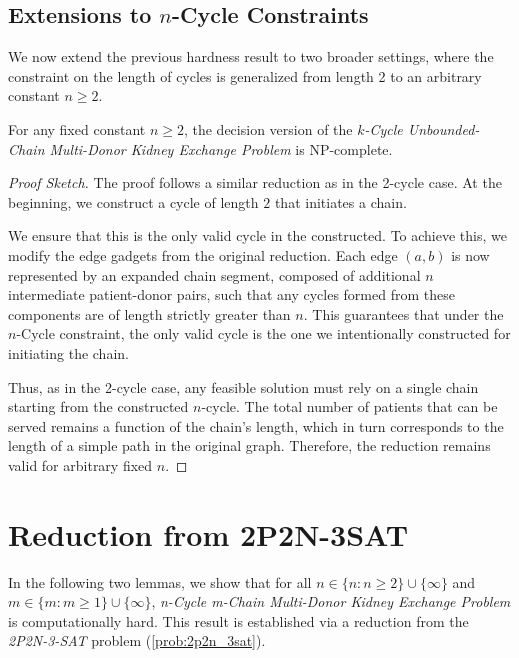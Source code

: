 \subsection{Extensions to $n$-Cycle Constraints}

We now extend the previous hardness result to two broader settings, where the constraint on the length of cycles is generalized from length 2 to an arbitrary constant $n \ge 2$.

\begin{lemma}
For any fixed constant $n \ge 2$, the decision version of the \textit{$k$-Cycle Unbounded-Chain Multi-Donor Kidney Exchange Problem} is NP-complete.
\end{lemma}

\begin{proof}[Proof Sketch]
The proof follows a similar reduction as in the 2-cycle case. At the beginning, we construct a cycle of length $2$ that initiates a chain. 

We ensure that this is the only valid cycle in the constructed. To achieve this, we modify the edge gadgets from the original reduction. Each edge $(a, b)$ is now represented by an expanded chain segment, composed of additional $n$ intermediate patient-donor pairs, such that any cycles formed from these components are of length strictly greater than $n$. This guarantees that under the $n$-Cycle constraint, the only valid cycle is the one we intentionally constructed for initiating the chain.

Thus, as in the 2-cycle case, any feasible solution must rely on a single chain starting from the constructed $n$-cycle. The total number of patients that can be served remains a function of the chain's length, which in turn corresponds to the length of a simple path in the original graph. Therefore, the reduction remains valid for arbitrary fixed $n$.
\end{proof}



\section{Reduction from 2P2N-3SAT}

In the following two lemmas, we show that for all $n \in \{n : n \ge 2\} \cup \{\infty\}$ and $m \in \{m:m \ge 1\} \cup \{\infty\}$, \textit{n-Cycle m-Chain Multi-Donor Kidney Exchange Problem} is computationally hard. This result is established via a reduction from the \textit{2P2N-3-SAT} problem (\autoref{prob:2p2n_3sat}). 


